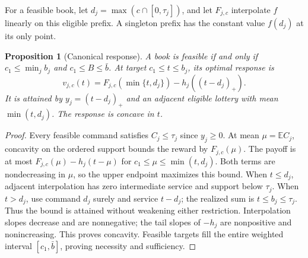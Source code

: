 \documentclass[11pt,letterpaper]{article}
\newtheorem{proposition}[theorem]{Proposition}
\theoremstyle{definition}\newtheorem{remark}[theorem]{Remark}
\begin{document}
For a feasible book, let $d_j=\max(c\cap[0,\tau_j])$, and let $F_{j,c}$ interpolate $f$ linearly on this eligible prefix. A singleton prefix has the constant value $f(d_j)$ at its only point.
\begin{proposition}[Canonical response]\label{prop:canonical52}
A book is feasible if and only if $c_1\leq\min_jb_j$ and $c_1\leq B\leq\bar b$. At target $c_1\leq t\leq b_j$, its optimal response is
\begin{equation}\label{eq:canonical52}
 v_{j,c}(t)=F_{j,c}(\min\{t,d_j\})-h_j((t-d_j)_+).
\end{equation}
It is attained by $y_j=(t-d_j)_+$ and an adjacent eligible lottery with mean $\min(t,d_j)$. The response is concave in $t$.
\end{proposition}
\begin{proof}
Every feasible command satisfies $C_j\leq\tau_j$ since $y_j\geq0$. At mean $\mu=\mathbb E C_j$, concavity on the ordered support bounds the reward by $F_{j,c}(\mu)$. The payoff is at most $F_{j,c}(\mu)-h_j(t-\mu)$ for $c_1\leq\mu\leq\min(t,d_j)$. Both terms are nondecreasing in $\mu$, so the upper endpoint maximizes this bound. When $t\leq d_j$, adjacent interpolation has zero intermediate service and support below $\tau_j$. When $t>d_j$, use command $d_j$ surely and service $t-d_j$; the realized sum is $t\leq b_j\leq\tau_j$. Thus the bound is attained without weakening either restriction. Interpolation slopes decrease and are nonnegative; the tail slopes of $-h_j$ are nonpositive and nonincreasing. This proves concavity. Feasible targets fill the entire weighted interval $[c_1,\bar b]$, proving necessity and sufficiency.
\end{proof}
\end{document}
